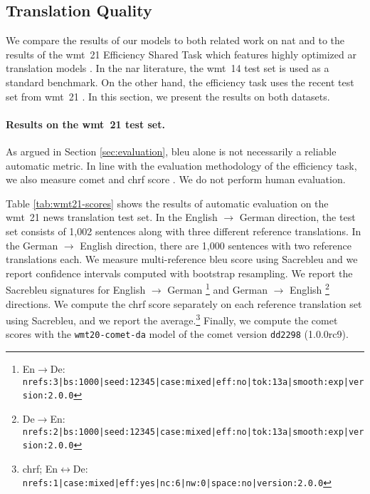 \subsection{Translation Quality}%
\label{subsec:results:quality}

We compare the results of our models to both related work on \ac{nat} and to
the results of the \ac{wmt}~21 Efficiency Shared Task which features highly
optimized \ac{ar} translation models \citep{heafield-etal-2021-findings}. In
the \ac{nar} literature, the \acs{wmt}~14 test set
\citep{bojar-etal-2014-findings} is used as a standard benchmark. On the other
hand, the efficiency task uses the recent test set from \acs{wmt}~21
\citep{akhbardeh-etal-2021-findings}. In this section, we present the results
on both datasets.

\paragraph{Results on the \acs{wmt}~21 test set.}
As argued in Section \ref{sec:evaluation}, \acs{bleu} alone is not necessarily
a reliable automatic metric. In line with the evaluation methodology of the
efficiency task, we also measure \acs{comet} \citep{rei-etal-2020-comet} and
\acs{chrf} score \citep{popovic-2015-chrf}. We do not perform human evaluation.

Table \ref{tab:wmt21-scores} shows the results of automatic evaluation
on the \acs{wmt}~21 news translation test set. In the English $\rightarrow$
German direction, the test set consists of 1,002 sentences along with three
different reference translations. In the German $\rightarrow$ English
direction, there are 1,000 sentences with two reference translations each. We
measure multi-reference \acs{bleu} score using Sacrebleu \citep{post-2018-call}
and we report confidence intervals computed with bootstrap resampling. We
report the Sacrebleu signatures for English $\rightarrow$ German%
\footnote{En$\rightarrow$De: {\scriptsize
    \texttt{nrefs:3|bs:1000|seed:12345|case:mixed|eff:no|tok:13a|smooth:exp|version:2.0.0}}}
and German $\rightarrow$ English%
\footnote{De$\rightarrow$En: {\scriptsize
    \texttt{nrefs:2|bs:1000|seed:12345|case:mixed|eff:no|tok:13a|smooth:exp|version:2.0.0}}}
directions. We compute the \acs{chrf} score separately on each reference
translation set using Sacrebleu, and we report the
average.\footnote{\acs{chrf}; En$\leftrightarrow$De: {\scriptsize
    \texttt{nrefs:1|case:mixed|eff:yes|nc:6|nw:0|space:no|version:2.0.0}}}
Finally, we compute the \acs{comet} scores with the \texttt{wmt20-comet-da}
model of the \acs{comet} version \texttt{dd2298} (1.0.0rc9).

